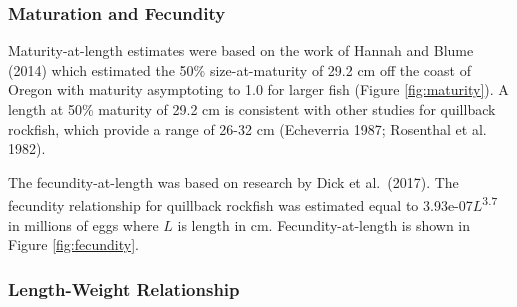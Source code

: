 \documentclass[11pt,
  english,
  a4paper,
]{article}
\begin{document}
\hypertarget{maturation-and-fecundity}{%
\subsubsection{Maturation and Fecundity}\label{maturation-and-fecundity}}

\leavevmode\tagmcend\tagstructend


Maturity-at-length estimates were based on the work of Hannah and Blume {(2014)\leavevmode\tagmcend\tagstructend} which estimated the 50\% size-at-maturity of 29.2 cm off the coast of Oregon with maturity asymptoting to 1.0 for larger fish (Figure \ref{fig:maturity}). A length at 50\% maturity of 29.2 cm is consistent with other studies for quillback rockfish, which provide a range of 26-32 cm {(Echeverria 1987; Rosenthal et al. 1982)\leavevmode\tagmcend\tagstructend}.

\leavevmode\tagmcend\tagstructend\par


The fecundity-at-length was based on research by Dick et al.~{(2017)\leavevmode\tagmcend\tagstructend}. The fecundity relationship for quillback rockfish was estimated equal to 3.93e-07{\(L\)\leavevmode\tagmcend\tagstructend}\textsuperscript{3.7} in millions of eggs where {\(L\)\leavevmode\tagmcend\tagstructend} is length in cm. Fecundity-at-length is shown in Figure \ref{fig:fecundity}.

\leavevmode\tagmcend\tagstructend\par


\hypertarget{length-weight-relationship}{%
\subsubsection{Length-Weight Relationship}\label{length-weight-relationship}}

\leavevmode\tagmcend\tagstructend

\end{document}
